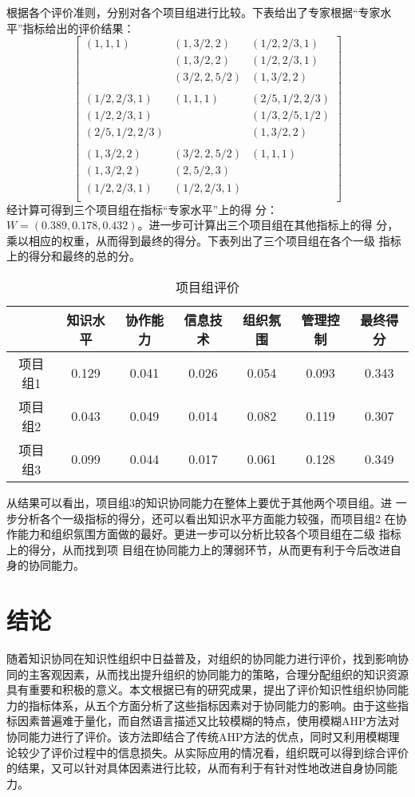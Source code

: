 \documentclass[adobefonts,UTF8]{ctexart}
\begin{document}
根据各个评价准则，分别对各个项目组进行比较。下表给出了专家根据“专家水
平”指标给出的评价结果：
\[
\left[
  \begin{array}{lllll}
(1,1,1)&(1,3/2,2)&(1/2,2/3,1)\\
       & (1,3/2,2)&(1/2,2/3,1) \\
       &(3/2,2,5/2)&(1,3/2,2)\\
\\
(1/2,2/3,1)&(1,1,1)&(2/5,1/2,2/3)\\
(1/2,2/3,1)& &(1/3,2/5,1/2)\\
(2/5,1/2,2/3)&&(1,3/2,2)\\
\\
(1,3/2,2)&(3/2,2,5/2)&(1,1,1)\\
(1,3/2,2)&(2,5/2,3)& \\
(1/2,2/3,1)&(1/2,2/3,1)&\\
\end{array}
\right]
\]
经计算可得到三个项目组在指标“专家水平”上的得
分：$W=(0.389,0.178,0.432)$。进一步可计算出三个项目组在其他指标上的得
分，乘以相应的权重，从而得到最终的得分。下表列出了三个项目组在各个一级
指标上的得分和最终的总的分。
\begin{table}[htb]
  \centering
  \caption{项目组评价}
  \begin{tabular}{ccccccc}
\hline
    &知识水平&协作能力&信息技术&组织氛围&管理控制&最终得分\\\hline
项目组1&0.129&0.041&0.026&0.054&0.093&0.343\\
项目组2&0.043&0.049&0.014&0.082&0.119&0.307\\
项目组3&0.099&0.044&0.017&0.061&0.128&0.349\\\hline
  \end{tabular}
\end{table}
从结果可以看出，项目组3的知识协同能力在整体上要优于其他两个项目组。进
一步分析各个一级指标的得分，还可以看出知识水平方面能力较强，而项目组2
在协作能力和组织氛围方面做的最好。更进一步可以分析比较各个项目组在二级
指标上的得分，从而找到项
目组在协同能力上的薄弱环节，从而更有利于今后改进自身的协同能力。

\section{结论}

随着知识协同在知识性组织中日益普及，对组织的协同能力进行评价，找到影响协同的主客观因素，从而找出提升组织的协同能力的策略，合理分配组织的知识资源具有重要和积极的意义。本文根据已有的研究成果，提出了评价知识性组织协同能力的指标体系，从五个方面分析了这些指标因素对于协同能力的影响。由于这些指标因素普遍难于量化，而自然语言描述又比较模糊的特点，使用模糊AHP方法对协同能力进行了评价。该方法即结合了传统AHP方法的优点，同时又利用模糊理论较少了评价过程中的信息损失。从实际应用的情况看，组织既可以得到综合评价的结果，又可以针对具体因素进行比较，从而有利于有针对性地改进自身协同能力。


\end{document}
